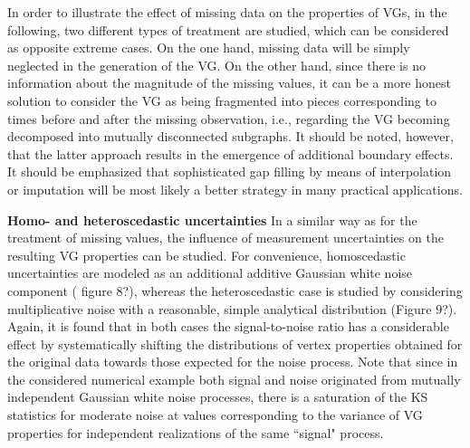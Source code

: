 		In order to illustrate the effect of missing data on the properties of VGs, in the following, two different types of treatment are studied, which can be considered as opposite extreme cases. On the one hand, missing data will be simply neglected in the generation of the VG. On the other hand, since there is no information about the magnitude of the missing values, it can be a more honest solution to consider the VG as being fragmented into pieces corresponding to times before and after the missing observation, i.e., regarding the VG becoming decomposed into mutually disconnected subgraphs. It should be noted, however, that the latter approach results in the emergence of additional boundary effects. It should be emphasized that sophisticated gap filling by means of interpolation or imputation will be most likely a better strategy in many practical applications. 

		{\bf{Homo- and heteroscedastic uncertainties}} In a similar way as for the treatment of missing values, the influence of measurement uncertainties on the resulting VG properties can be studied. For convenience, homoscedastic uncertainties are modeled as an additional additive Gaussian white noise component ({\color{red} figure 8?}), whereas the heteroscedastic case is studied by considering multiplicative noise with a reasonable, simple analytical distribution ({\color{red}Figure 9?}). Again, it is found that in both cases the signal-to-noise ratio has a considerable effect by systematically shifting the distributions of vertex properties obtained for the original data towards those expected for the noise process. Note that since in the considered numerical example both signal and noise originated from mutually independent Gaussian white noise processes, there is a saturation of the KS statistics for moderate noise at values corresponding to the variance of VG properties for independent realizations of the same ``signal" process.
		
